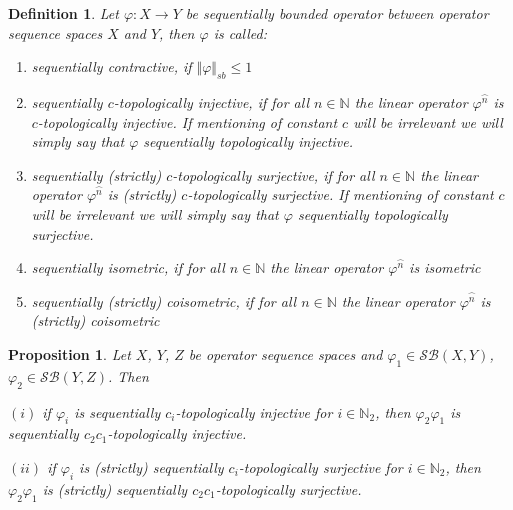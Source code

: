 \documentclass[12pt]{article}
\newtheorem{proposition}[theorem]{Proposition}
\newtheorem{definition}[theorem]{Definition}
\begin{document}
\begin{definition}\label{DefSBOpType}
Let $\varphi:X\to Y$ be sequentially bounded operator between operator 
sequence spaces $X$ and $Y$, then $\varphi$ is called:
\begin{enumerate}[label = (\roman*)]
    \item \textit{sequentially contractive}, if $\Vert \varphi\Vert_{sb}\leq 1$

    \item \textit{sequentially $c$-topologically injective}, if for all 
    $n \in \mathbb{N}$ the linear operator $\varphi^{\wideparen{n}}$ is 
    $c$-topologically injective. If mentioning of constant $c$ will be 
    irrelevant we will simply say that $\varphi$ sequentially 
    topologically injective.
    
    \item \textit{sequentially (strictly) $c$-topologically surjective}, 
    if for all $n \in \mathbb{N}$ the linear operator 
    $\varphi^{\wideparen{n}}$ is (strictly) $c$-topologically surjective. 
    If mentioning of constant $c$ will be irrelevant we will simply say 
    that $\varphi$ sequentially topologically surjective.

    \item \textit{sequentially isometric}, if for all $n\in\mathbb{N}$ 
    the linear operator $\varphi^{\wideparen{n}}$ is isometric

    \item \textit{sequentially (strictly) coisometric}, if for all 
    $n\in\mathbb{N}$ the linear operator $\varphi^{\wideparen{n}}$ is 
    (strictly) coisometric
\end{enumerate}
\end{definition}
\begin{proposition}\label{PrComposeSQTopInjSur} 
Let $X$, $Y$, $Z$ be operator sequence spaces and 
$\varphi_1\in\mathcal{SB}(X,Y)$, $\varphi_2\in\mathcal{SB}(Y,Z)$. Then

$(i)$ if $\varphi_i$ is sequentially $c_i$-topologically injective for 
$i\in\mathbb{N}_2$, then $\varphi_2\varphi_1$ is sequentially 
$c_2c_1$-topologically injective.

$(ii)$ if $\varphi_i$ is (strictly) sequentially $c_i$-topologically surjective 
for $i\in\mathbb{N}_2$, then $\varphi_2\varphi_1$ is (strictly) 
sequentially $c_2c_1$-topologically surjective.
\end{proposition}
\end{document}
